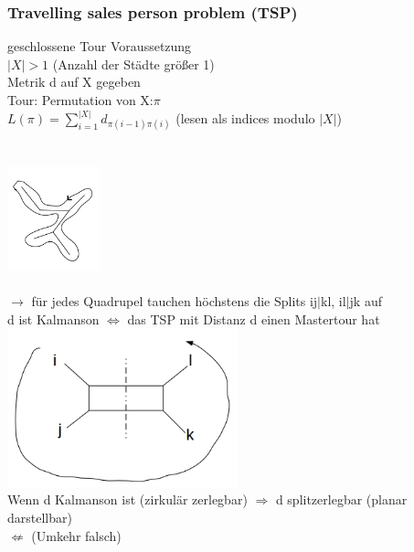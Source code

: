 \subsubsection{Travelling sales person problem (TSP)}
geschlossene Tour Voraussetzung\\
$|X|>1$ (Anzahl der Städte größer 1)\\
Metrik d auf X gegeben\\
Tour: Permutation von X:$\pi$\\
$L(\pi)=\displaystyle\sum_{i=1}^{|X|}d_{\pi(i-1)\pi(i)}$ (lesen als indices modulo $|X|$)
\\\\
\\
\includegraphics[width=0.2\textwidth]{lectures/161216/pix/6.jpg}\\

\\
$\rightarrow$ für jedes Quadrupel tauchen höchstens die Splits ij$|$kl, il$|$jk auf\\
d ist Kalmanson $\Leftrightarrow$ das TSP mit Distanz d einen Mastertour hat\\
\includegraphics[width=0.5\textwidth]{lectures/161216/pix/7.jpg}\\
Wenn d Kalmanson ist (zirkulär zerlegbar) $\Rightarrow$ d splitzerlegbar (planar darstellbar)\\
$\nLeftarrow$ (Umkehr falsch)\\

